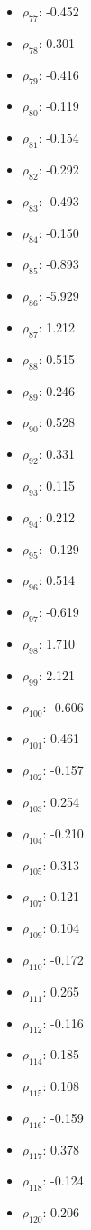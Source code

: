 \documentclass[12pt,letterpaper]{article}   %
\begin{document}
\begin{multicols}{5}
\begin{itemize}
    \item $\rho_{77}$: -0.452
    \item $\rho_{78}$: 0.301
    \item $\rho_{79}$: -0.416
    \item $\rho_{80}$: -0.119
    \item $\rho_{81}$: -0.154
    \item $\rho_{82}$: -0.292
    \item $\rho_{83}$: -0.493
    \item $\rho_{84}$: -0.150
    \item $\rho_{85}$: -0.893
    \item $\rho_{86}$: -5.929
    \item $\rho_{87}$: 1.212
    \item $\rho_{88}$: 0.515
    \item $\rho_{89}$: 0.246
    \item $\rho_{90}$: 0.528
    \item $\rho_{92}$: 0.331
    \item $\rho_{93}$: 0.115
    \item $\rho_{94}$: 0.212
    \item $\rho_{95}$: -0.129
    \item $\rho_{96}$: 0.514
    \item $\rho_{97}$: -0.619
    \item $\rho_{98}$: 1.710
    \item $\rho_{99}$: 2.121
    \item $\rho_{100}$: -0.606
    \item $\rho_{101}$: 0.461
    \item $\rho_{102}$: -0.157
    \item $\rho_{103}$: 0.254
    \item $\rho_{104}$: -0.210
    \item $\rho_{105}$: 0.313
    \item $\rho_{107}$: 0.121
    \item $\rho_{109}$: 0.104
    \item $\rho_{110}$: -0.172
    \item $\rho_{111}$: 0.265
    \item $\rho_{112}$: -0.116
    \item $\rho_{114}$: 0.185
    \item $\rho_{115}$: 0.108
    \item $\rho_{116}$: -0.159
    \item $\rho_{117}$: 0.378
    \item $\rho_{118}$: -0.124
    \item $\rho_{120}$: 0.206
\end{itemize}
\end{multicols}
\end{document}
